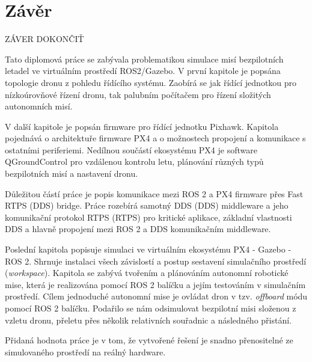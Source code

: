 \chapter*{Závěr}
{}

ZÁVER DOKONČIŤ

Tato diplomová práce se zabývala problematikou simulace misí bezpilotních letadel ve virtuálním prostředí ROS2/Gazebo. V první kapitole je popsána topologie dronu z pohledu řídícího systému. Zaobírá se jak řídící jednotkou pro nízkoúrovňové řízení dronu, tak palubním počítačem pro řízení složitých autonomních misí.

V další kapitole je popsán firmware pro řídící jednotku Pixhawk. Kapitola pojednává o architektuře firmware PX4 a o možnostech propojení a komunikace s ostatními periferiemi. Nedílnou součástí ekosystému PX4 je software QGroundControl pro vzdálenou kontrolu letu, plánování různých typů bezpilotních misí a nastavení dronu.

Důležitou částí práce je popis komunikace mezi ROS 2 a PX4 firmware přes Fast RTPS (\acs{DDS}) bridge. Práce rozebírá samotný \acs{DDS} (\acl{DDS}) middleware a jeho komunikační protokol \acs{RTPS} (\acl{RTPS}) pro kritické aplikace, základní vlastnosti \acs{DDS} a hlavně propojení mezi ROS 2 a \acs{DDS} komunikačním middleware.

Poslední kapitola popisuje simulaci ve virtuálním ekosystému PX4 - Gazebo - ROS 2. Shrnuje instalaci všech závislostí a postup sestavení simulačního prostředí (\textit{workspace}). Kapitola se zabývá tvořením a plánováním autonomní robotické mise, která je realizována pomocí ROS 2 balíčku a jejím testováním v simulačním prostředí. Cílem jednoduché autonomní mise je ovládat dron v tzv. \textit{offboard} módu pomocí ROS 2 balíčku. Podařilo se nám odsimulovat bezpilotní misi složenou z vzletu dronu, přeletu přes několik relativních souřadnic a následného přistání.



Přidaná hodnota práce je v tom, že vytvořené řešení je snadno přenositelné ze simulovaného prostředí na reálný hardware.

